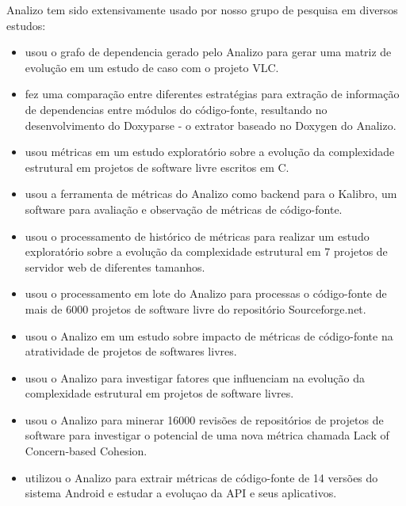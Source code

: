 Analizo tem sido extensivamente usado por nosso grupo de pesquisa em diversos
estudos:

\begin{itemize}

  \item \cite{Amaral2009} usou o grafo de dependencia gerado pelo Analizo para
  gerar uma matriz de evolução em um estudo de caso com o projeto VLC.

  \item \cite{Costa2009} fez uma comparação entre diferentes estratégias para
  extração de informação de dependencias entre módulos do código-fonte,
  resultando no desenvolvimento do Doxyparse - o extrator baseado no Doxygen do
  Analizo.

  \item \cite{Terceiro2009} usou métricas em um estudo exploratório sobre a
  evolução da complexidade estrutural em projetos de software livre escritos em
  C.

  \item \cite{Morais2009} usou a ferramenta de métricas do Analizo como backend
  para o Kalibro, um software para avaliação e observação de métricas de código-fonte.
  
  \item \cite{Terceiro2010} usou o processamento de histórico de métricas para
  realizar um estudo exploratório sobre a evolução da complexidade estrutural em
  7 projetos de servidor web de diferentes tamanhos.

  \item \cite{Meirelles2010} usou o processamento em lote do Analizo para
  processas o código-fonte de mais de 6000 projetos de software livre do
  repositório Sourceforge.net.

  \item \cite{Meirelles2011} usou o Analizo em um estudo sobre impacto de
  métricas de código-fonte na atratividade de projetos de softwares livres.

  \item \cite{Terceiro2012Understanding} usou o Analizo para investigar fatores
  que influenciam na evolução da complexidade estrutural em projetos de software
  livres.

  \item \cite{Silva2012} usou o Analizo para minerar 16000 revisões de
  repositórios de projetos de software para investigar o potencial de uma nova
  métrica chamada Lack of Concern-based Cohesion.

  \item \cite{Ronaldo2015} utilizou o Analizo para extrair métricas de
  código-fonte de 14 versões do sistema Android e estudar a evoluçao da API e
  seus aplicativos.

\end{itemize}

